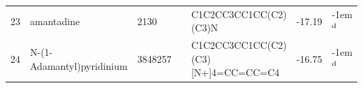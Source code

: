 \documentclass[aps,pre,twocolumn,nofootinbib,superscriptaddress,10pt, final,tightenlines]{revtex4-1}
\begin{document}
\begin{table}
\begin{tabular}{lllp{1.5cm}>{\ttfamily}lS[table-format=-1.2, table-figures-uncertainty=1]l}
23 & amantadine                         & 2130      & \parbox[c]{1em}{\includegraphics[scale=0.2]{figures/2130.pdf}}      & C1C2CC3CC1CC(C2)(C3)N                        & -17.19  & \kern-1em {$^{\rm d}$}  \\
24 & N-(1-Adamantyl)pyridinium          & 3848257   & \parbox[c]{1em}{\includegraphics[scale=0.2]{figures/3848257.pdf}}   & C1C2CC3CC1CC(C2)(C3)[N+]4=CC=CC=C4           & -16.75  & \kern-1em {$^{\rm d}$}  \\


\end{tabular}
\end{table}
\end{document}
